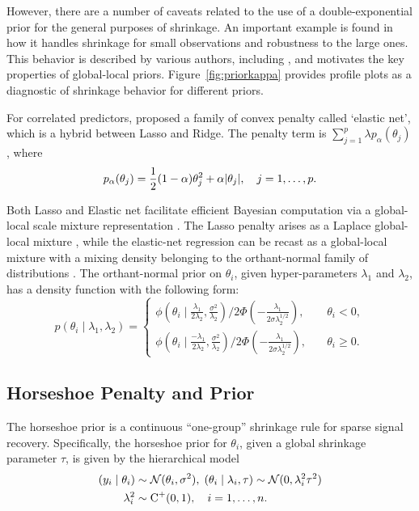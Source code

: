 \documentclass[sts,preprint]{imsart}
\begin{document}
However, there are a number of caveats related to the use of a double-exponential prior for the general purposes of shrinkage.  An important example is found in how it handles shrinkage for small observations and
robustness to the large ones.  This behavior is described by various authors, including \cite{polson2010shrink,datta2013asymptotic}, and motivates the key properties of global-local priors. Figure~\ref{fig:priorkappa} provides profile plots as a diagnostic of shrinkage behavior for different
priors.

For correlated predictors, \cite{zou2005regularization} proposed a family of convex penalty called `elastic net', which is a hybrid between Lasso and Ridge.
The penalty term is $\sum_{j=1}^{p} \lambda p_{\alpha}(\theta_j)$, where 
\[
p_{\alpha}(\theta_j) = \frac{1}{2} (1-\alpha)\theta_j^2 + \alpha \lvert\theta_j\rvert, \quad j = 1, \ldots, p. 
\]

Both Lasso and Elastic net facilitate efficient Bayesian computation via a
global-local scale mixture representation \citep{bhadra2016global}. The Lasso
penalty arises as a Laplace global-local mixture \citep{andrews1974scale},
while the elastic-net regression can be recast as a global-local mixture with a
mixing density belonging to the orthant-normal family of distributions
\citep{hans2011elastic}.  The orthant-normal prior on $\theta_i$, given
hyper-parameters $\lambda_1$ and $\lambda_2$, has a density function with the
following form:
\begin{equation}
  p(\theta_i \mid \lambda_1, \lambda_2)  = 
  \begin{cases} 
   \phi(\theta_i \mid \frac{\lambda_1}{2\lambda_2}, \frac{\sigma^2}{\lambda_2}) / 2\Phi\left(-\frac{\lambda_1}{2\sigma \lambda_2^{1/2} }\right), & \quad \theta_i < 0, \\
   \phi(\theta_i \mid \frac{-\lambda_1}{2\lambda_2}, \frac{\sigma^2}{\lambda_2}) / 2\Phi\left(-\frac{\lambda_1}{2\sigma \lambda_2^{1/2} }\right), & \quad \theta_i \geq 0. \end{cases} 
  \label{eq:hans}
\end{equation}


\subsection{Horseshoe Penalty and Prior}\label{sec:one-gp}

The horseshoe prior is a continuous ``one-group'' shrinkage rule for sparse signal recovery. Specifically, the horseshoe prior for $\theta_i$, given a global shrinkage parameter $\tau$, is given by the hierarchical model 
\begin{align}
  (y_i \mid \theta_i) & \sim {\cal N}(\theta_i , \sigma^2),\;
  (\theta_i \mid \lambda_i, \tau) \sim 
  {\cal N}(0, \lambda_i^2 \tau^2) \nonumber \\ \lambda_i ^2 &
  \sim \operatorname{C}^{+}(0,1), \quad i = 1, \ldots, n. 
  \label{eq:hs}
\end{align}
\end{document}

